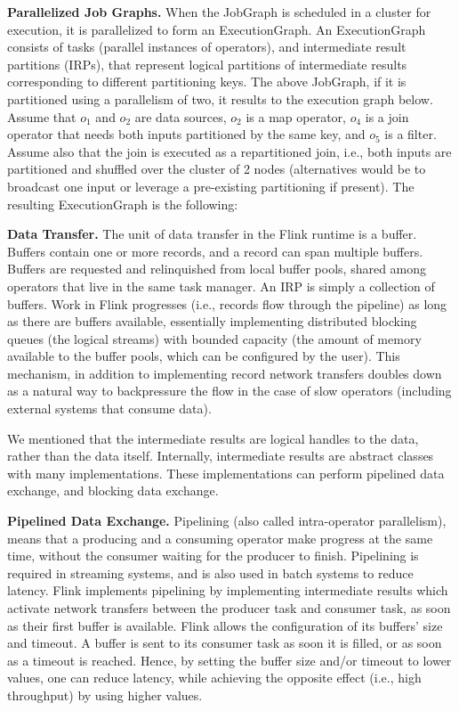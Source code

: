 \documentclass{sig-alternate}
\begin{document}
\textbf{Parallelized Job Graphs.} When the JobGraph is scheduled in a cluster for execution, it is parallelized to form an ExecutionGraph. An ExecutionGraph consists of tasks (parallel instances of operators), and intermediate result partitions (IRPs), that represent logical partitions of intermediate results corresponding to different partitioning keys. The above JobGraph, if it is partitioned using a parallelism of two, it results to the execution graph below. Assume that $o_1$ and $o_2$ are data sources, $o_2$ is a map operator, $o_4$ is a join operator that needs both inputs partitioned by the same key, and $o_5$ is a filter. Assume also that the join is executed as a repartitioned join, i.e., both inputs are partitioned and shuffled over the cluster of 2 nodes (alternatives would be to broadcast one input or leverage a pre-existing partitioning if present). The resulting ExecutionGraph is the following:


\textbf{Data Transfer.} The unit of data transfer in the Flink runtime is a buffer. Buffers contain one or more records, and a record can span multiple buffers. Buffers are requested and relinquished from local buffer pools, shared among operators that live in the same task manager. An IRP is simply a collection of buffers. Work in Flink progresses (i.e., records flow through the pipeline) as long as there are buffers available, essentially implementing distributed blocking queues (the logical streams) with bounded capacity (the amount of memory available to the buffer pools, which can be configured by the user). This mechanism, in addition to implementing record network transfers doubles down as a natural way to backpressure the flow in the case of slow operators (including external systems that consume data). 

We mentioned that the intermediate results are logical handles to the data, rather than the data itself. Internally, intermediate results are abstract classes with many implementations. These implementations can perform pipelined data exchange, and blocking data exchange.

\textbf{Pipelined Data Exchange.} Pipelining (also called intra-operator parallelism), means that a producing and a consuming operator make progress at the same time, without the consumer waiting for the producer to finish. Pipelining is required in streaming systems, and is also used in batch systems to reduce latency. Flink implements pipelining by implementing intermediate results which activate network transfers between the producer task and consumer task,  as soon as their first buffer is available. Flink allows the configuration of its buffers' size and timeout. A buffer is sent to its consumer task as soon it is filled,  or as soon as a timeout is reached. Hence, by setting the buffer size and/or timeout to lower values, one can reduce latency, while achieving the opposite effect (i.e., high throughput) by using higher values.
\end{document}
